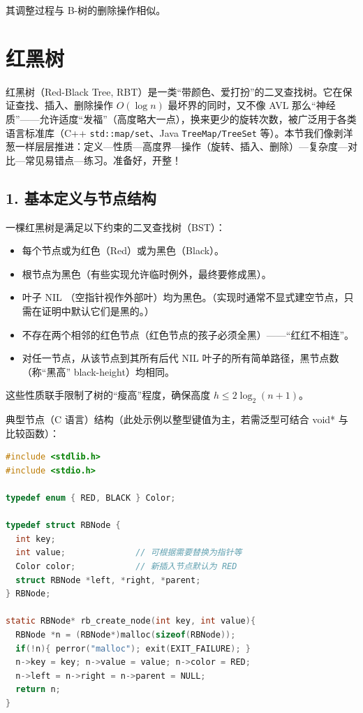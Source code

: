 \documentclass[lang=cn,newtx,10pt,scheme=chinese]{../elegantbook}
\begin{document}
      其调整过程与 B-树的删除操作相似。
\section{红黑树}

红黑树（Red-Black Tree, RBT）是一类“带颜色、爱打扮”的二叉查找树。它在保证查找、插入、删除操作 \(O(\log n)\) 最坏界的同时，又不像 AVL 那么“神经质”——允许适度“发福”（高度略大一点），换来更少的旋转次数，被广泛用于各类语言标准库（C++ \texttt{std::map/set}、Java \texttt{TreeMap/TreeSet} 等）。本节我们像剥洋葱一样层层推进：定义—性质—高度界—操作（旋转、插入、删除）—复杂度—对比—常见易错点—练习。准备好，开整！

\subsection{1. 基本定义与节点结构}
一棵红黑树是满足以下约束的二叉查找树（BST）：
\begin{itemize}
  \item 每个节点或为红色（Red）或为黑色（Black）。
  \item 根节点为黑色（有些实现允许临时例外，最终要修成黑）。
  \item 叶子 NIL （空指针视作外部叶）均为黑色。（实现时通常不显式建空节点，只需在证明中默认它们是黑的。）
  \item 不存在两个相邻的红色节点（红色节点的孩子必须全黑）——“红红不相连”。
  \item 对任一节点，从该节点到其所有后代 NIL 叶子的所有简单路径，黑节点数（称“黑高” black-height）均相同。
\end{itemize}
这些性质联手限制了树的“瘦高”程度，确保高度 \(h \le 2\log_2(n+1)\)。

典型节点（C 语言）结构（此处示例以整型键值为主，若需泛型可结合 void* 与比较函数）：
\begin{lstlisting}[language=C]
#include <stdlib.h>
#include <stdio.h>

typedef enum { RED, BLACK } Color;

typedef struct RBNode {
  int key;
  int value;              // 可根据需要替换为指针等
  Color color;            // 新插入节点默认为 RED
  struct RBNode *left, *right, *parent;
} RBNode;

static RBNode* rb_create_node(int key, int value){
  RBNode *n = (RBNode*)malloc(sizeof(RBNode));
  if(!n){ perror("malloc"); exit(EXIT_FAILURE); }
  n->key = key; n->value = value; n->color = RED;
  n->left = n->right = n->parent = NULL;
  return n;
}
\end{lstlisting}
\end{document}
